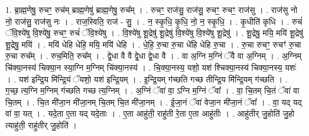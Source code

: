 \documentclass[17pt]{extarticle}
\begin{document}
1. ब्रा॒ह्म॒णेषु॒ रुचꣳ॒॒ रुच॑म् ब्राह्म॒णेषु॑ ब्राह्म॒णेषु॒ रुच᳚म् । . रुचꣳ॒॒ राज॑सु॒ राज॑सु॒ रुचꣳ॒॒ रुचꣳ॒॒ राज॑सु । . राज॑सु नो नो॒ राज॑सु॒ राज॑सु नः । . राज॒स्विति॒ राज॑ - सु॒ । . न॒ स्कृ॒धि॒ कृ॒धि॒ नो॒ न॒ स्कृ॒धि॒ । . कृ॒धीति॑ कृधि । . रुचं॑ ॅवि॒श्ये॑षु वि॒श्ये॑षु॒ रुचꣳ॒॒ रुचं॑ ॅवि॒श्ये॑षु । . वि॒श्ये॑षु शू॒द्रेषु॑ शू॒द्रेषु॑ वि॒श्ये॑षु वि॒श्ये॑षु शू॒द्रेषु॑ । . शू॒द्रेषु॒ मयि॒ मयि॑ शू॒द्रेषु॑ शू॒द्रेषु॒ मयि॑ । . मयि॑ धेहि धेहि॒ मयि॒ मयि॑ धेहि । . धे॒हि॒ रु॒चा रु॒चा धे॑हि धेहि रु॒चा । . रु॒चा रुचꣳ॒॒ रुचꣳ॑ रु॒चा रु॒चा रुच᳚म् । . रुच॒मिति॒ रुच᳚म् । . द्वे॒धा वै वै द्वे॒धा द्वे॒धा वै । . वा अ॒ग्नि म॒ग्निं ॅवै वा अ॒ग्निम् । . अ॒ग्निम् चि॑क्या॒नस्य॑ चिक्या॒न स्या॒ग्नि म॒ग्निम् चि॑क्या॒नस्य॑ । . चि॒क्या॒नस्य॒ यशो॒ यश॑ श्चिक्या॒नस्य॑ चिक्या॒नस्य॒ यशः॑ । . यश॑ इन्द्रि॒य मि॑न्द्रि॒यं ॅयशो॒ यश॑ इन्द्रि॒यम् । . इ॒न्द्रि॒यम् ग॑च्छति गच्छ तीन्द्रि॒य मि॑न्द्रि॒यम् ग॑च्छति । . ग॒च्छ॒ त्य॒ग्नि म॒ग्निम् ग॑च्छति गच्छ त्य॒ग्निम् । . अ॒ग्निं ॅवा॑ वा॒ ऽग्नि म॒ग्निं ॅवा᳚ । . वा॒ चि॒तम् चि॒तं ॅवा॑ वा चि॒तम् । . चि॒त मी॑जा॒न मी॑जा॒नम् चि॒तम् चि॒त मी॑जा॒नम् । . ई॒जा॒नं ॅवा॑ वेजा॒न मी॑जा॒नं ॅवा᳚ । . वा॒ यद् यद् वा॑ वा॒ यत् । . यदे॒ता ए॒ता यद् यदे॒ताः । . ए॒ता आहु॑ती॒ राहु॑ती रे॒ता ए॒ता आहु॑तीः । . आहु॑तीर् जु॒होति॑ जु॒हो त्याहु॑ती॒ राहु॑तीर् जु॒होति॑ । \newline
\end{document}
